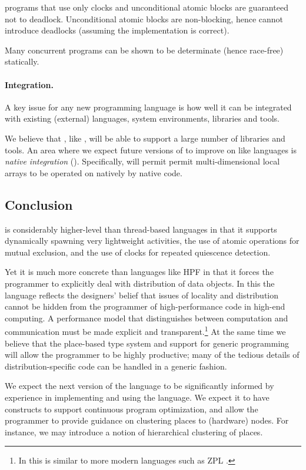 \Xten{} programs that use only clocks and unconditional atomic
blocks are guaranteed not to deadlock. Unconditional atomic blocks
are non-blocking, hence cannot introduce deadlocks (assuming the
implementation is correct).

Many concurrent programs can be shown to be determinate (hence
race-free) statically.

\paragraph{Integration.}
A key issue for any new programming language is how well it can be
integrated with existing (external) languages, system environments,
libraries and tools.

We believe that \Xten{}, like \java{}, will be able to support a large
number of libraries and tools. An area where we expect future versions
of \Xten{} to improve on \java{} like languages is \emph{native
integration} (). Specifically, \Xten{} will permit
permit multi-dimensional local arrays to be operated on natively by
native code.

\subsection{Conclusion}
{}\Xten{} is considerably higher-level than thread-based languages in
that it supports dynamically spawning very lightweight activities, the
use of atomic operations for mutual exclusion, and the use of clocks
for repeated quiescence detection.

Yet it is much more concrete than languages like HPF in that it forces
the programmer to explicitly deal with distribution of data
objects. In this the language reflects the designers' belief that
issues of locality and distribution cannot be hidden from the
programmer of high-performance code in high-end computing.  A
performance model that distinguishes between computation and
communication must be made explicit and transparent.\footnote{In this
\Xten{} is similar to more modern languages such as ZPL \cite{zpl}.}
At the same time we believe that the place-based type system and
support for generic programming will allow the \Xten{} programmer to
be highly productive; many of the tedious details of
distribution-specific code can be handled in a generic fashion.

We expect the next version of the language to be significantly
informed by experience in implementing and using the language. We
expect it to have constructs to support continuous program
optimization, and allow the programmer to provide guidance on
clustering places to (hardware) nodes. For instance, we may introduce
a notion of hierarchical clustering of places.




